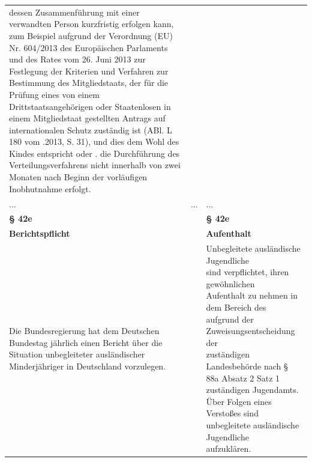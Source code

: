 \documentclass[10pt,a4paper,landscape]{article}
\begin{document}
\begin{longtable}{|L{8.2cm}|L{8.2cm}|L{8.2cm}|}
  dessen Zusammenführung mit einer  \newline verwandten Person kurzfristig erfolgen  \newline kann, zum Beispiel aufgrund der  \newline Verordnung (EU) Nr. 604/2013 des  \newline Europäischen Parlaments und des Rates  \newline vom 26. Juni 2013 zur Festlegung der  \newline Kriterien und Verfahren zur Bestimmung  \newline des Mitgliedstaats, der für die Prüfung  \newline eines von einem Drittstaatsangehörigen  \newline oder Staatenlosen in einem Mitgliedstaat  \newline gestellten Antrags auf internationalen  \newline Schutz zuständig ist (ABl. L 180 vom  .2013, S. 31), und dies dem Wohl des  \newline Kindes entspricht oder   .   die Durchführung des  \newline Verteilungsverfahrens nicht innerhalb von  \newline \textcolor{diffgreen}{zwei Monaten} nach Beginn der vorläufigen  \newline Inobhutnahme erfolgt. \\
\hhline{|---|}
... & ... & ... \\
\hhline{|---|}
\textbf{\S{} 42e} &  & \textbf{\S{} 42e} \\
\hhline{|---|}
\textbf{\textcolor{diffred}{Berichtspflicht}} &  & \textbf{\textcolor{diffgreen}{Aufenthalt}} \\
\hhline{|---|}
\textcolor{diffred}{Die Bundesregierung hat} dem \textcolor{diffred}{Deutschen  \newline Bundestag jährlich einen Bericht über die  \newline Situation unbegleiteter ausländischer  \newline Minderjähriger in Deutschland vorzulegen.} &  & \textcolor{diffgreen}{Unbegleitete ausländische Jugendliche  \newline sind verpflichtet, ihren gewöhnlichen  \newline Aufenthalt zu nehmen in} dem \textcolor{diffgreen}{Bereich des  \newline aufgrund der Zuweisungsentscheidung der  \newline zuständigen Landesbehörde nach \S{} 88a  Absatz 2 Satz 1 zuständigen Jugendamts.  \newline Über Folgen eines Verstoßes sind  \newline unbegleitete ausländische Jugendliche  \newline aufzuklären.} \\

\end{longtable}
\end{document}
